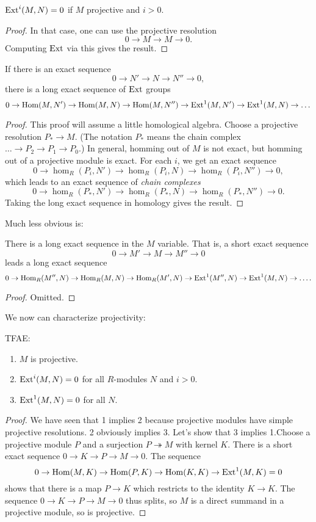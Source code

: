 \begin{proposition}
$\operatorname{Ext}^i(M,N) = 0$ if $M$ projective and $i>0$.
\end{proposition}
\begin{proof}
In that case, one can use the projective resolution
\[ 0 \to M \to M \to 0.  \]
Computing $\operatorname{Ext}$ via this gives the result.
\end{proof}




\begin{proposition}
If there is an exact sequence
\[ 0 \to N' \to N \to N'' \to 0,  \]
there is a long exact sequence of $\operatorname{Ext}$ groups
\[ 0 \to \operatorname{Hom}(M,N') \to \operatorname{Hom}(M,N) \to \operatorname{Hom}(M,N'') \to
\operatorname{Ext}^1(M,N') \to
\operatorname{Ext}^1(M,N) \to \dots  \]
\end{proposition}
\begin{proof}
This proof will assume a little homological algebra. Choose a
projective
resolution $P_* \to M$. (The notation $P_*$ means the chain
complex $\dots \to
P_2 \to P_1 \to P_0$.) In general, homming out of $M$ is not
exact, but homming
out of a projective module is exact. For each $i$, we get an
exact sequence
\[ 0 \to \hom_R(P_i, N') \to \hom_R(P_i, N) \to \hom_R(P_i,
N'')\to 0, \]
which leads to an exact sequence of \emph{chain complexes}
\[ 0 \to \hom_R(P_*,N') \to \hom_R(P_*,N) \to \hom_R(P_*,N'')
\to 0 . \]
Taking the long exact sequence in homology gives the result.
\end{proof}


Much less obvious is:

\begin{proposition}
There is a long exact sequence in the $M$ variable. That is, a
short exact
sequence
\[ 0 \to M' \to M \to M'' \to 0  \]
leads a long exact sequence
\[ 0 \to \operatorname{Hom}_R(M'', N) \to \operatorname{Hom}_R(M,N) \to \operatorname{Hom}_R(M', N) \to
\operatorname{Ext}^1(M'', N)
\to \operatorname{Ext}^1(M, N) \to \dots.  \]
\end{proposition}
\begin{proof}
Omitted.
\end{proof}

We now can characterize projectivity:
\begin{corollary}
TFAE:
\begin{enumerate}
\item $M$ is projective.
\item $\operatorname{Ext}^i(M,N) = 0$ for all $R$-modules $N$ and $i>0$.
\item  $\operatorname{Ext}^1(M,N)=0$ for all $N$.
\end{enumerate}
\end{corollary}
\begin{proof}
We have seen that 1 implies 2 because projective modules have
simple projective
resolutions. 2 obviously implies 3. Let's show that 3 implies
1.Choose a
projective module $P$ and a surjection $P \twoheadrightarrow M$
with kernel
$K$. There is a short exact sequence $0 \to K \to P \to M \to
0$. The sequence
\[ 0 \to \operatorname{Hom}(M,K) \to \operatorname{Hom}(P,K) \to \operatorname{Hom}(K,K) \to
\operatorname{Ext}^1(M,K)=0\]
shows that there is a map $P \to K$ which restricts to the
identity $K \to K$.
The sequence $0 \to K \to P \to M \to 0$ thus splits, so $M$ is
a direct
summand in a projective module, so is projective.
\end{proof}


